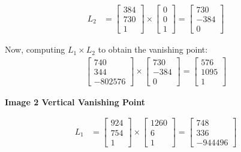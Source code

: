 \documentclass[12pt, oneside]{article}
\begin{document}
\begin{align*}
L_2 &=    \begin{bmatrix}
            384 \\
            730 \\
            1
        \end{bmatrix} \times 
        \begin{bmatrix}
            0 \\
            0 \\
            1
        \end{bmatrix}  = 
        \begin{bmatrix}
            730  \\
            -384 \\
            0 
        \end{bmatrix}                                                   
\end{align*}

Now, computing $L_1 \times L_2$ to obtain the vanishing point:
\begin{align*}
    \begin{bmatrix}
        740  \\
        344 \\
        -802576 
    \end{bmatrix} \times 
    \begin{bmatrix}
        730  \\
        -384 \\
        0 
    \end{bmatrix}   = 
\begin{bmatrix}
    576  \\
    1095 \\
    1 
\end{bmatrix}
\end{align*}


\textbf{Image 2 Vertical Vanishing Point}

\begin{align*}
L_1 &=  
\begin{bmatrix} 924 \\ 754 \\ 1 \end{bmatrix} \times 
\begin{bmatrix} 1260 \\ 6 \\ 1 \end{bmatrix}  = 
\begin{bmatrix} 748  \\ 336 \\ -944496 \end{bmatrix}
\end{align*}
\end{document}
